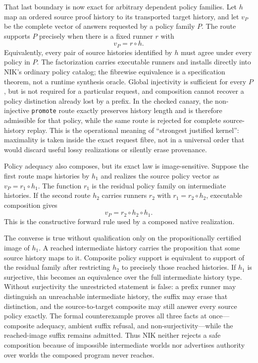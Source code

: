 \documentclass[11pt]{article}
\newcommand{\code}[1]{\texttt{#1}}
\begin{document}
That last boundary is now exact for arbitrary dependent policy families.  Let
$h$ map an ordered source proof history to its transported target history, and
let $v_P$ be the complete vector of answers requested by a policy family $P$.
The route supports $P$ precisely when there is a fixed runner $r$ with
\[
  v_P = r \circ h.
\]
Equivalently, every pair of source histories identified by $h$ must agree under
every policy in $P$.  The factorization carries executable runners and installs
directly into NIK's ordinary policy catalog; the fibrewise equivalence is a
specification theorem, not a runtime synthesis oracle.  Global injectivity is
sufficient for every $P$, but is not required for a particular request, and
composition cannot recover a policy distinction already lost by a prefix.  In
the checked canary, the non-injective \code{promote} route exactly preserves
history length and is therefore admissible for that policy, while the same
route is rejected for complete source-history replay.  This is the operational
meaning of ``strongest justified kernel'': maximality is taken inside the exact
request fibre, not in a universal order that would discard useful lossy
realizations or silently erase provenance.

Policy adequacy also composes, but its exact law is image-sensitive.  Suppose
the first route maps histories by $h_1$ and realizes the source policy vector
as $v_P=r_1\circ h_1$.  The function $r_1$ is the residual policy family on
intermediate histories.  If the second route $h_2$ carries runners $r_2$ with
$r_1=r_2\circ h_2$, executable composition gives
\[
  v_P = r_2\circ h_2\circ h_1.
\]
This is the constructive forward rule used by a composed native realization.

The converse is true without qualification only on the propositionally
certified image of $h_1$.  A reached intermediate history carries the
proposition that some
source history maps to it.  Composite policy support is equivalent to support
of the residual family after restricting $h_2$ to precisely those reached
histories.  If $h_1$ is surjective, this becomes an equivalence over the full
intermediate history type.  Without surjectivity the unrestricted statement is
false: a prefix runner may distinguish an unreachable intermediate history,
the suffix may erase that distinction, and the source-to-target composite may
still answer every source policy exactly.  The formal counterexample proves
all three facts at once---composite adequacy, ambient suffix refusal, and
non-surjectivity---while the reached-image suffix remains admitted.  Thus NIK
neither rejects a safe composition because of impossible intermediate worlds
nor advertises authority over worlds the composed program never reaches.
\end{document}
